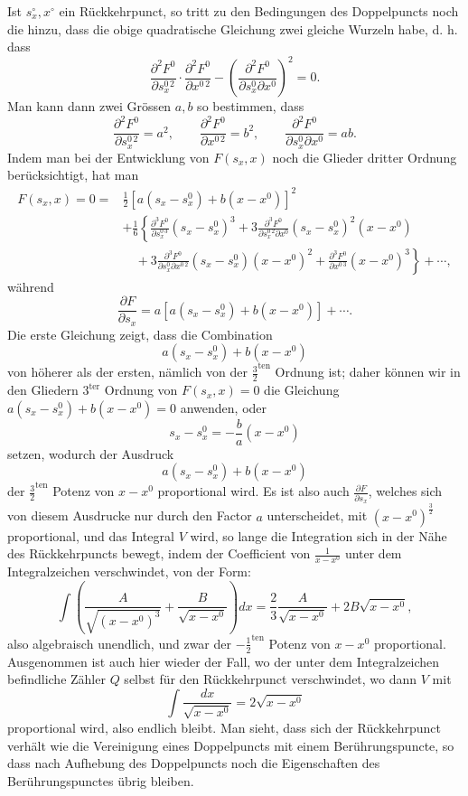\documentclass[10pt]{article}
\begin{document}
Ist $s_x^\circ,x^\circ$ ein Rückkehrpunct, so tritt zu den Bedingungen des Doppelpuncts noch die hinzu, dass die obige quadratische Gleichung zwei gleiche Wurzeln habe, d. h. dass
\[
\frac{\partial^2F^0}{\partial s_x^{0\,2}}\cdot\frac{\partial^2F^0}{\partial x^{0\,2}}-
\left(\frac{\partial^2F^0}{\partial s_x^0\partial x^0}\right)^2=0.
\]
Man kann dann zwei Grössen $a,b$ so bestimmen, dass
\[
\frac{\partial^2F^0}{\partial s_x^{0\,2}}=a^2,
\qquad
\frac{\partial^2F^0}{\partial x^{0\,2}}=b^2,
\qquad
\frac{\partial^2F^0}{\partial s_x^0\partial x^0}=ab.
\]
Indem man bei der Entwicklung von $F(s_x,x)$ noch die Glieder dritter Ordnung berücksichtigt, hat man
\[
\begin{aligned}
F(s_x,x)=0={}&\frac12\left[a(s_x-s_x^0)+b(x-x^0)\right]^2\\
&+\frac16\left\{\frac{\partial^3F^0}{\partial s_x^{0\,3}}(s_x-s_x^0)^3
+3\frac{\partial^3F^0}{\partial s_x^{0\,2}\partial x^0}(s_x-s_x^0)^2(x-x^0)\right.\\
&\left.\quad+3\frac{\partial^3F^0}{\partial s_x^0\partial x^{0\,2}}(s_x-s_x^0)(x-x^0)^2
+\frac{\partial^3F^0}{\partial x^{0\,3}}(x-x^0)^3\right\}+\cdots,
\end{aligned}
\]
während
\[
\frac{\partial F}{\partial s_x}=a\left[a(s_x-s_x^0)+b(x-x^0)\right]+\cdots.
\]
Die erste Gleichung zeigt, dass die Combination
\[
a(s_x-s_x^0)+b(x-x^0)
\]
von höherer als der ersten, nämlich von der $\frac32^{\mathrm{ten}}$ Ordnung ist; daher können wir in den Gliedern $3^{\mathrm{ter}}$ Ordnung von $F(s_x,x)=0$ die Gleichung $a(s_x-s_x^0)+b(x-x^0)=0$ anwenden, oder
\[
s_x-s_x^0=-\frac{b}{a}(x-x^0)
\]
setzen, wodurch der Ausdruck
\[
a(s_x-s_x^0)+b(x-x^0)
\]
der $\frac32^{\mathrm{ten}}$ Potenz von $x-x^0$ proportional wird. Es ist also auch $\frac{\partial F}{\partial s_x}$, welches sich von diesem Ausdrucke nur durch den Factor $a$ unterscheidet, mit $(x-x^0)^{\frac32}$ proportional, und das Integral $V$ wird, so lange die Integration sich in der Nähe des Rückkehrpuncts bewegt, indem der Coefficient von $\frac{1}{x-x^0}$ unter dem Integralzeichen verschwindet, von der Form:
\[
\int\left(\frac{A}{\sqrt{(x-x^0)^3}}+\frac{B}{\sqrt{x-x^0}}\right)dx=
\frac{2}{3}\frac{A}{\sqrt{x-x^0}}+2B\sqrt{x-x^0},
\]
also algebraisch unendlich, und zwar der $-\frac12^{\mathrm{ten}}$ Potenz von $x-x^0$ proportional. Ausgenommen ist auch hier wieder der Fall, wo der unter dem Integralzeichen befindliche Zähler $Q$ selbst für den Rückkehrpunct verschwindet, wo dann $V$ mit
\[
\int\frac{dx}{\sqrt{x-x^0}}=2\sqrt{x-x^0}
\]
proportional wird, also endlich bleibt. Man sieht, dass sich der Rückkehrpunct verhält wie die Vereinigung eines Doppelpuncts mit einem Berührungspuncte, so dass nach Aufhebung des Doppelpuncts noch die Eigenschaften des Berührungspunctes übrig bleiben.
\end{document}
